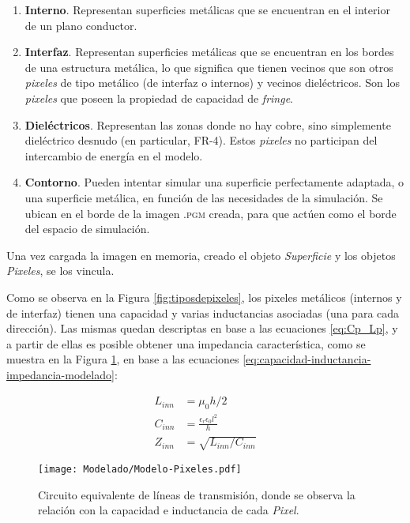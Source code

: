 \begin{enumerate}
	\item \textbf{Interno}. Representan superficies metálicas que se encuentran en el interior de un plano conductor.
	\item \textbf{Interfaz}. Representan superficies metálicas que se encuentran en los bordes de una estructura metálica, lo que significa que tienen vecinos que son otros \textit{pixeles} de tipo metálico (de interfaz o internos) y vecinos dieléctricos. Son los \textit{pixeles} que poseen la propiedad de capacidad de \textit{fringe}.
	\item \textbf{Dieléctricos}. Representan las zonas donde no hay cobre, sino simplemente dieléctrico desnudo (en particular, FR-4). Estos \textit{pixeles} no participan del intercambio de energía en el modelo.
	\item \textbf{Contorno}. Pueden intentar simular una superficie perfectamente adaptada, o una superficie metálica, en función de las necesidades de la simulación. Se ubican en el borde de la imagen \textsc{.pgm} creada, para que actúen como el borde del espacio de simulación.
\end{enumerate}


Una vez cargada la imagen en memoria, creado el objeto \textit{Superficie} y los objetos \textit{Pixeles}, se los vincula.

Como se observa en la Figura \ref{fig:tiposdepixeles}, los pixeles metálicos (internos y de interfaz) tienen una capacidad y varias inductancias asociadas (una para cada dirección). Las mismas quedan descriptas en base a las ecuaciones \ref{eq:Cp_Lp}, y a partir de ellas es posible obtener una impedancia característica, como se muestra en la Figura \ref{fig:modelo-con-lineas-de-transmision}, en base a las ecuaciones \ref{eq:capacidad-inductancia-impedancia-modelado}:

\begin{subequations}
	\label{eq:capacidad-inductancia-impedancia-modelado}
	\begin{align}
		L_{inn} &= \mu_0 h /2 \\
		C_{inn} &= \frac{\epsilon_r \epsilon_0 l^2}{h} \\
		Z_{inn} &= \sqrt{L_{inn} / C_{inn}}
	\end{align}
\end{subequations}

\begin{figure}[h]
	\centering
	\texttt{[image: Modelado/Modelo-Pixeles.pdf]}
	\caption{Circuito equivalente de líneas de transmisión, donde se observa la relación con la capacidad e inductancia de cada \textit{Pixel}.}
	\label{fig:modelo-con-lineas-de-transmision}
\end{figure}

